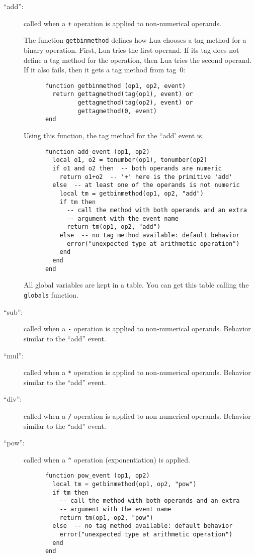 \documentclass[11pt]{article}
\begin{document}
\begin{description}

\item[``add'':]
called when a \verb|+| operation is applied to non-numerical operands.

The function \verb|getbinmethod| defines how Lua chooses a tag method
for a binary operation.
First, Lua tries the first operand.
If its tag does not define a tag method for the operation,
then Lua tries the second operand.
If it also fails, then it gets a tag method from tag~0:
\begin{verbatim}
      function getbinmethod (op1, op2, event)
        return gettagmethod(tag(op1), event) or
               gettagmethod(tag(op2), event) or
               gettagmethod(0, event)
      end
\end{verbatim}
Using this function,
the tag method for the ``add' event is
\begin{verbatim}
      function add_event (op1, op2)
        local o1, o2 = tonumber(op1), tonumber(op2)
        if o1 and o2 then  -- both operands are numeric
          return o1+o2  -- '+' here is the primitive 'add'
        else  -- at least one of the operands is not numeric
          local tm = getbinmethod(op1, op2, "add")
          if tm then
            -- call the method with both operands and an extra
            -- argument with the event name
            return tm(op1, op2, "add")
          else  -- no tag method available: default behavior
            error("unexpected type at arithmetic operation")
          end
        end
      end
\end{verbatim}

All global variables are kept in a table.
You can get this table calling the \verb|globals| function.

\item[``sub'':]
called when a \verb|-| operation is applied to non-numerical operands.
Behavior similar to the ``add'' event.

\item[``mul'':]
called when a \verb|*| operation is applied to non-numerical operands.
Behavior similar to the ``add'' event.

\item[``div'':]
called when a \verb|/| operation is applied to non-numerical operands.
Behavior similar to the ``add'' event.

\item[``pow'':]
called when a \verb|^| operation (exponentiation) is applied.
\begin{verbatim}
      function pow_event (op1, op2)
        local tm = getbinmethod(op1, op2, "pow")
        if tm then
          -- call the method with both operands and an extra
          -- argument with the event name
          return tm(op1, op2, "pow")
        else  -- no tag method available: default behavior
          error("unexpected type at arithmetic operation")
        end
      end
\end{verbatim}


\end{description}
\end{document}
